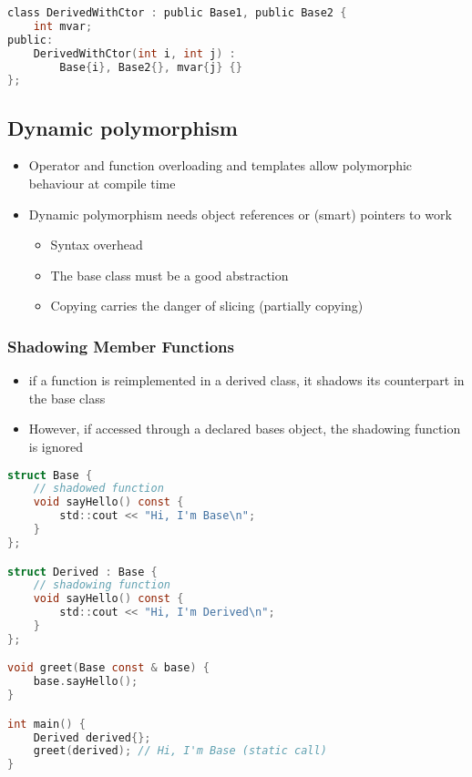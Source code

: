 \begin{lstlisting}[style=frame, style= linenumbers, language=C]
class DerivedWithCtor : public Base1, public Base2 {
    int mvar;
public:
    DerivedWithCtor(int i, int j) :
        Base{i}, Base2{}, mvar{j} {}
};
\end{lstlisting}


\subsection{Dynamic polymorphism}
\begin{itemize}
    \item Operator and function overloading and templates allow polymorphic behaviour at compile time
    \item Dynamic polymorphism needs object references or (smart) pointers to work
    \begin{itemize}
        \item Syntax overhead
        \item The base class must be a good abstraction
        \item Copying carries the danger of slicing (partially copying)
    \end{itemize}
\end{itemize}

\subsubsection{Shadowing Member Functions}
\begin{itemize}
    \item if a function is reimplemented in a derived class, it shadows its counterpart in the base class
    \item However, if accessed through a declared bases object, the shadowing function is ignored
\end{itemize}

\begin{lstlisting}[style=frame, style= linenumbers, language=C]
struct Base {
    // shadowed function
    void sayHello() const {
        std::cout << "Hi, I'm Base\n";
    }
};

struct Derived : Base {
    // shadowing function
    void sayHello() const {
        std::cout << "Hi, I'm Derived\n";
    }
};

void greet(Base const & base) {
    base.sayHello();
}

int main() {
    Derived derived{};
    greet(derived); // Hi, I'm Base (static call)
}
\end{lstlisting}

